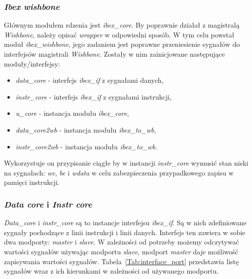 \documentclass[11pt,a4paper]{article}
\begin{document}
	\subsubsection{\textit{Ibex wishbone}}
	\hspace{5mm}
		Głównym modułem rdzenia jest \textit{ibex\_core}. By poprawnie działał z magistralą \textit{Wishbone}, należy opisać \textit{wrapper} w odpowiedni sposób. W tym celu powstał moduł \textit{ibex\_wishbone}, jego zadaniem jest poprawne przeniesienie sygnałów do interfejsów magistrali \textit{Wishbone}. Zostały w nim zainicjowane następujące moduły/interfejsy:
\begin{itemize}
	\item \textit{data\_core} - interfejs \textit{ibex\_if} z sygnałami danych,
	\item \textit{instr\_core} - interfejs \textit{ibex\_if} z sygnałami instrukcji,
	\item \textit{u\_core} - instancja modułu \textit{ibex\_core},
	\item \textit{data\_core2wb} - instancja modułu \textit{ibex\_to\_wb},
	\item \textit{instr\_core2wb} - instancja modułu \textit{ibex\_to\_wb}.
\end{itemize}		
Wykorzystuje on przypisanie ciągłe by w instancji \textit{instr\_core} wymusić stan niski na sygnałach: \textit{we}, \textit{be} i \textit{wdata} w celu zabezpieczenia przypadkowego zapisu w pamięci instrukcji.
			
	\subsubsection{\textit{Data core} i \textit{Instr core}}
	\hspace{5mm}
\textit{Data\_core} i \textit{instr\_core} są to instancje interfejsu \textit{ibex\_if}. Są w nich zdefiniowane sygnały pochodzące z linii instrukcji i linii danych. Interfejs ten zawiera w sobie dwa modporty: \textit{master} i \textit{slave}. W zależności od potrzeby możemy odczytywać wartości sygnałów używając modportu \textit{slave}, modport \textit{master} daje możliwość zapisywania wartości sygnałów. \mbox{Tabela \ref{Tab:interface_port}} przedstawia listę sygnałów wraz z ich kierunkami w zależności od używanego modportu.
\end{document}

